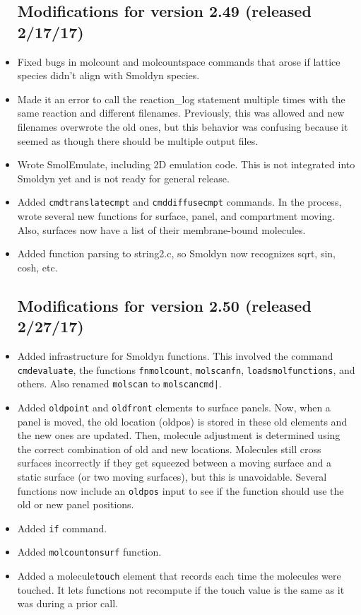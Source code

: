 \documentclass {scrbook}
\newcommand {\ttt} {\texttt}
\begin{document}
\begin{itemize}
\subsection{Modifications for version 2.49 (released 2/17/17)}
\item Fixed bugs in molcount and molcountspace commands that arose if lattice species didn't align with Smoldyn species.
\item Made it an error to call the reaction\_log statement multiple times with the same reaction and different filenames. Previously, this was allowed and new filenames overwrote the old ones, but this behavior was confusing because it seemed as though there should be multiple output files.
\item Wrote SmolEmulate, including 2D emulation code. This is not integrated into Smoldyn yet and is not ready for general release.
\item Added \ttt{cmdtranslatecmpt} and \ttt{cmddiffusecmpt} commands. In the process, wrote several new functions for surface, panel, and compartment moving. Also, surfaces now have a list of their membrane-bound molecules.
\item Added function parsing to string2.c, so Smoldyn now recognizes sqrt, sin, cosh, etc.

\subsection{Modifications for version 2.50 (released 2/27/17)}
\item Added infrastructure for Smoldyn functions. This involved the command \ttt{cmdevaluate}, the functions \ttt{fnmolcount}, \ttt{molscanfn}, \ttt{loadsmolfunctions}, and others. Also renamed \ttt{molscan} to \ttt{molscancmd|}.
\item Added \ttt{oldpoint} and \ttt{oldfront} elements to surface panels. Now, when a panel is moved, the old location (oldpos) is stored in these old elements and the new ones are updated. Then, molecule adjustment is determined using the correct combination of old and new locations. Molecules still cross surfaces incorrectly if they get squeezed between a moving surface and a static surface (or two moving surfaces), but this is unavoidable. Several functions now include an \ttt{oldpos} input to see if the function should use the old or new panel positions.
\item Added \ttt{if} command.
\item Added \ttt{molcountonsurf} function.
\item Added a molecule\ttt{touch} element that records each time the molecules were touched. It lets functions not recompute if the touch value is the same as it was during a prior call.


\end{itemize}
\end{document}

